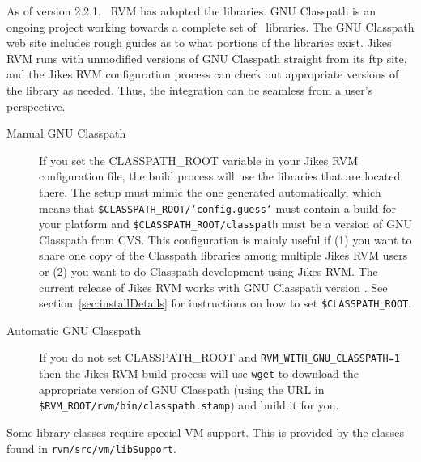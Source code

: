  As of version 2.2.1, \JikesTM\ RVM has adopted the
 libraries.  GNU
Classpath is an ongoing project working towards a complete set of
\JavaTM\ libraries.  The GNU Classpath web site includes
rough guides as to what portions of the libraries exist.  Jikes RVM
runs with unmodified versions of GNU Classpath straight from its ftp
site, and the Jikes RVM configuration process can check out
appropriate versions of the library as needed.  Thus, the integration
can be seamless from a user's perspective.

\begin{description}
\item[Manual GNU Classpath] If you set the CLASSPATH\_ROOT variable in
your Jikes RVM configuration file, the build process will use the
libraries that are located there.  The setup must mimic the one
generated automatically, which means that
{\tt \$CLASSPATH\_ROOT/`config.guess`} must contain a build for your platform
and {\tt \$CLASSPATH\_ROOT/classpath} must be a version of GNU Classpath from
CVS.  This configuration is mainly useful if (1) you want to share one
copy of the Classpath libraries among multiple Jikes RVM users or (2)
you want to do Classpath development using Jikes RVM. The
current release of Jikes RVM works with GNU Classpath version
\classpathversion. See section~\ref{sec:installDetails} for instructions
on how to set {\tt \$CLASSPATH\_ROOT}.

\item[Automatic GNU Classpath] If you do not set CLASSPATH\_ROOT and 
{\tt RVM\_WITH\_GNU\_CLASSPATH=1} then the Jikes RVM build process
will use {\tt wget} to download the appropriate version of GNU Classpath (using
the URL in {\tt \$RVM\_ROOT/rvm/bin/classpath.stamp}) and build it for
you. 
\end{description}

Some library classes require special VM support.  This is provided by
the classes found in {\tt rvm/src/vm/libSupport}. 

\JavaTMFooter
\JikesTMFooter
